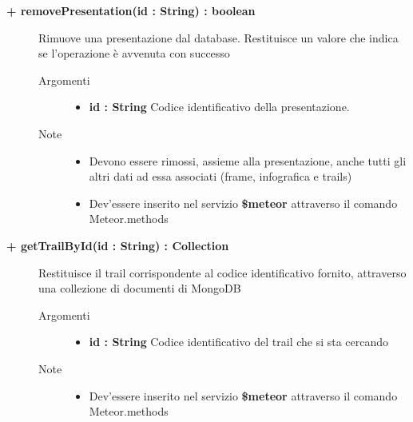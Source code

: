 \begin{description}
	\begin{description}
		\item[\textbf{\color{blue}+ removePresentation(id : String) : boolean			}] \hfill
			Rimuove una presentazione dal database. Restituisce un valore che indica se l'operazione è avvenuta con successo
			
		\begin{description}
			\item[Argomenti] \hfill
				\begin{itemize}
				
					\item \textbf{id : String			} \hfill
					Codice identificativo della presentazione.
					
				\end{itemize}
			\item[Note] \hfill
			\begin{itemize}
					\item Devono essere rimossi, assieme alla presentazione, anche tutti gli altri dati ad essa associati (frame, infografica e trails)
					\item Dev'essere inserito nel servizio \textbf{\$meteor} attraverso il comando Meteor.methods
				\end{itemize}
		\end{description}
	\end{description}
	
	\begin{description}
		\item[\textbf{\color{blue}+ getTrailById(id : String) : Collection			}] \hfill
			Restituisce il trail corrispondente al codice identificativo fornito, attraverso una collezione di documenti di MongoDB
			
		\begin{description}
			\item[Argomenti] \hfill
				\begin{itemize}
				
					\item \textbf{id : String			} \hfill
					Codice identificativo del trail che si sta cercando
					
				\end{itemize}
			\item[Note] \hfill
			\begin{itemize}
					\item Dev'essere inserito nel servizio \textbf{\$meteor} attraverso il comando Meteor.methods
				\end{itemize}
		\end{description}
	\end{description}
	

\end{description}
